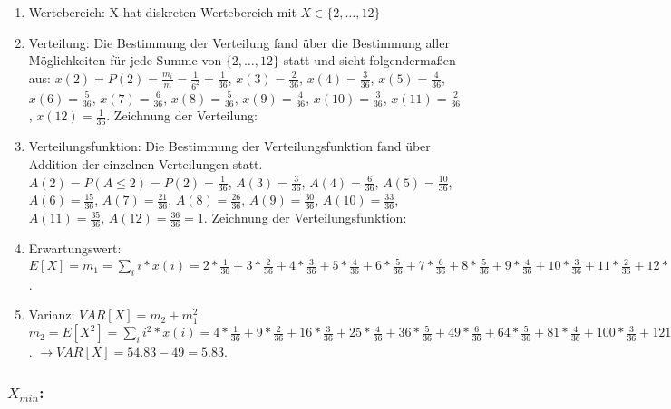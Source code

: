 \documentclass[%
10pt,              %
ngerman,           %
a4paper,           %
DIV11,             %
]{scrartcl}%
\begin{document}
\begin{enumerate}
	\item Wertebereich: X hat diskreten Wertebereich mit $X \in \{2, \dots, 12 \}$
	\item Verteilung: Die Bestimmung der Verteilung fand über die Bestimmung aller Möglichkeiten für jede Summe von $\{2, \dots, 12 \}$ statt und sieht folgendermaßen aus:\newline
	$x(2) = P(2) = \frac{m_i}{m} = \frac{1}{6^2} = \frac{1}{36}$,\newline
	$x(3) = \frac{2}{36}$, $x(4) = \frac{3}{36}$, $x(5) = \frac{4}{36}$, $x(6) = \frac{5}{36}$, $x(7) = \frac{6}{36}$, $x(8) = \frac{5}{36}$, $x(9) = \frac{4}{36}$, $x(10) = \frac{3}{36}$, $x(11) = \frac{2}{36}$, $x(12) = \frac{1}{36}$. Zeichnung der Verteilung: 
	
	\item Verteilungsfunktion: Die Bestimmung der Verteilungsfunktion fand über Addition der einzelnen Verteilungen statt.\newline
	$A(2) = P(A \leq 2) = P(2) = \frac{1}{36}$,\newline
	$A(3) = \frac{3}{36}$, $A(4) = \frac{6}{36}$, $A(5) = \frac{10}{36}$, $A(6) = \frac{15}{36}$, $A(7) = \frac{21}{36}$, $A(8) = \frac{26}{36}$, $A(9) = \frac{30}{36}$, $A(10) = \frac{33}{36}$, $A(11) = \frac{35}{36}$, $A(12) = \frac{36}{36} = 1$. Zeichnung der Verteilungsfunktion: 
	
	\item Erwartungswert: $E[X] = m_1 = \sum_{i} i * x(i) = 2 * \frac{1}{36} + 3 * \frac{2}{36} + 4 * \frac{3}{36} + 5 * \frac{4}{36} + 6 * \frac{5}{36} + 7 * \frac{6}{36} + 8 * \frac{5}{36} + 9 * \frac{4}{36} + 10 * \frac{3}{36} + 11 * \frac{2}{36} + 12 * \frac{1}{36} = 7$.
	\item Varianz: $VAR[X] = m_2 + m_1^2$\newline
	$m_2 = E[X^2] = \sum_{i} i^2 * x(i) = 4 * \frac{1}{36} + 9 * \frac{2}{36} + 16 * \frac{3}{36} + 25 * \frac{4}{36} + 36 * \frac{5}{36} + 49 * \frac{6}{36} + 64 * \frac{5}{36} + 81 * \frac{4}{36} + 100 * \frac{3}{36} + 121 * \frac{2}{36} + 144 * \frac{1}{36} \approx 54.83$.\newline
	$\rightarrow VAR[X] = 54.83 - 49 = 5.83$.
\end{enumerate}

\subsubsection*{$X_{min}$:}
\end{document}
